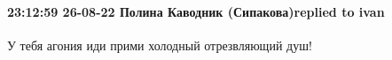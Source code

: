  
 
 
 
 

\paragraph{23:12:59 26-08-22 Полина Каводник (Сипакова)replied to ivan}

У тебя агония иди прими холодный отрезвляющий душ!
